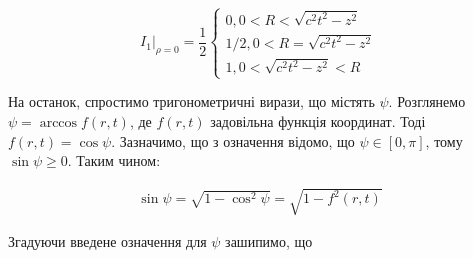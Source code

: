 \begin{equation}
\left. I_1 \right|_{\rho = 0} = \frac{1}{2} \begin{cases}
0, 0 < R < \sqrt{c^2t^2 - z^2} \\
1/2, 0 < R = \sqrt{c^2t^2 - z^2} \\ 
1, 0 < \sqrt{c^2t^2 - z^2} < R 
\end{cases}
\end{equation}

На останок, спростимо тригонометричні вирази, що містять $ \psi $. Розглянемо 
$ \psi = \arccos f(r,t) $, де $ f(r,t) $ задовільна функція координат. 
Тоді $ f(r,t) = \cos \psi $. Зазначимо, що з означення відомо, що 
$ \psi \in \left[ 0, \pi \right] $, тому $ \sin \psi \geq 0 $. Таким чином:

\begin{equation*} \begin{aligned}
\sin \psi = \sqrt{1 - \cos^2 \psi } = \sqrt{1 - f^2(r,t)}
\end{aligned} \end{equation*}

Згадуючи введене означення для $ \psi $ зашипимо, що

